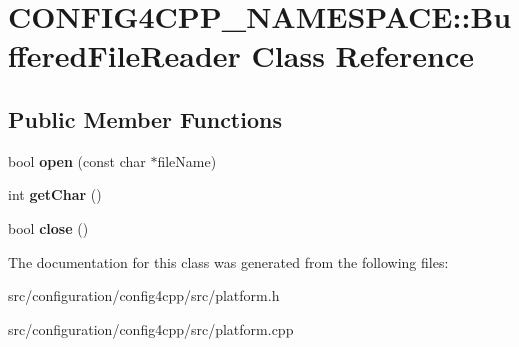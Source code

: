 \hypertarget{classCONFIG4CPP__NAMESPACE_1_1BufferedFileReader}{\section{C\-O\-N\-F\-I\-G4\-C\-P\-P\-\_\-\-N\-A\-M\-E\-S\-P\-A\-C\-E\-:\-:Buffered\-File\-Reader Class Reference}
\label{classCONFIG4CPP__NAMESPACE_1_1BufferedFileReader}
}
\subsection*{Public Member Functions}
\begin{DoxyCompactItemize}
\item 
\hypertarget{classCONFIG4CPP__NAMESPACE_1_1BufferedFileReader_a339c2d89211e56a705f963eb67e8258a}{bool {\bfseries open} (const char $\ast$file\-Name)}\label{classCONFIG4CPP__NAMESPACE_1_1BufferedFileReader_a339c2d89211e56a705f963eb67e8258a}

\item 
\hypertarget{classCONFIG4CPP__NAMESPACE_1_1BufferedFileReader_ac2c7bdfc743c33aae63f2739112b50f4}{int {\bfseries get\-Char} ()}\label{classCONFIG4CPP__NAMESPACE_1_1BufferedFileReader_ac2c7bdfc743c33aae63f2739112b50f4}

\item 
\hypertarget{classCONFIG4CPP__NAMESPACE_1_1BufferedFileReader_a42aafc0d7e1403fa2cd86526faf198ec}{bool {\bfseries close} ()}\label{classCONFIG4CPP__NAMESPACE_1_1BufferedFileReader_a42aafc0d7e1403fa2cd86526faf198ec}

\end{DoxyCompactItemize}


The documentation for this class was generated from the following files\-:\begin{DoxyCompactItemize}
\item 
src/configuration/config4cpp/src/platform.\-h\item 
src/configuration/config4cpp/src/platform.\-cpp\end{DoxyCompactItemize}
